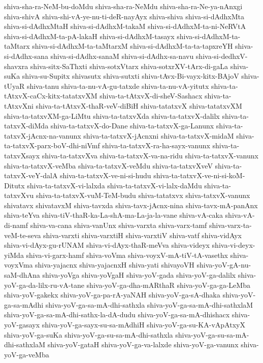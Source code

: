 {shiva-sha-ra-NeM-bu-doMdu
shiva-sha-ra-NeMdu
shiva-sha-ra-Ne-ya-nAnxgi
shiva-shivA
shiva-shi-vA-ye-nu-ti-deR-nayAyx
shiva-shiva
shiva-si-dAdhxMta
shiva-si-dAdhxMtaH
shiva-si-dAdhxM-takaM
shiva-si-dAdhxM-ta-ni-NeRVtA
shiva-si-dAdhxM-ta-pA-lakaH
shiva-si-dAdhxM-tasayx
shiva-si-dAdhxM-ta-taMtarx
shiva-si-dAdhxM-ta-taMtarxM
shiva-si-dAdhxM-ta-ta-tapxreYH
shiva-si-dAdhx-sana
shiva-si-dAdhx-sanaM
shiva-si-dAdhx-sa-navu
shiva-si-dedhxV-shavxra
shiva-sitx-SaThxti
shiva-sotxVtarx
shiva-sotxrXV-tArx-di-gaLa
shiva-suKa
shiva-su-Supitx
shivasutx
shiva-sutxti
shiva-tAvx-Bi-vayx-kitx-BAjoV
shiva-tUyaR
shiva-tanu
shiva-ta-nu-vA-gu-tatxde
shiva-ta-nu-vA-yitutx
shiva-ta-tAtxvX-caCx-kitx-tatatxvXM
shiva-ta-tAtxvX-di-sheV-Sashacx
shiva-ta-tAtxvXni
shiva-ta-tAtxvX-thaR-veV-diBiH
shiva-tatatxvX
shiva-tatatxvXM
shiva-ta-tatxvXM-ga-LiMtu
shiva-ta-tatxvXda
shiva-ta-tatxvX-dalilx
shiva-ta-tatxvX-diMda
shiva-ta-tatxvX-do-Dane
shiva-ta-tatxvX-ga-Lanunx
shiva-ta-tatxvX-jAcnx-na-vanunx
shiva-ta-tatxvX-jAcnxni
shiva-ta-tatxvX-midaM
shiva-ta-tatxvX-parx-boV-dhi-niVmf
shiva-ta-tatxvX-ra-ha-sayx-vanunx
shiva-ta-tatxvXsayx
shiva-ta-tatxvXva
shiva-ta-tatxvX-va-na-ridu
shiva-ta-tatxvX-vanunx
shiva-ta-tatxvX-veMba
shiva-ta-tatxvX-veMdu
shiva-ta-tatxvXveV
shiva-ta-tatxvX-veY-dalA
shiva-ta-tatxvX-ve-ni-si-hudu
shiva-ta-tatxvX-ve-ni-si-koM-Ditutx
shiva-ta-tatxvX-vi-lalxda
shiva-ta-tatxvX-vi-lalx-daMdu
shiva-ta-tatxvXvu
shiva-ta-tatxvX-vuM-TeM-budu
shiva-tatatxvx
shiva-tatxvX-vanunx
shivatavx
shivatavxM
shiva-tavxda
shiva-tavx-jAcnx-nina
shiva-tavx-mA-panAnx
shiva-teYva
shiva-tiV-thaR-ka-La-shA-ma-La-ja-la-vane
shiva-vA-caka
shiva-vA-di-namf
shiva-va-cana
shiva-vanUnx
shiva-varxta
shiva-varx-tamf
shiva-varx-ta-veM-te-seva
shiva-varxti
shiva-varxtiH
shiva-varxtiV
shiva-vatf
shiva-vidAyx
shiva-vi-dAyx-gu-rUNAM
shiva-vi-dAyx-thaR-meVva
shiva-videyx
shiva-vi-deyx-yiMda
shiva-vi-garx-hamf
shiva-voVma
shiva-voyxV-mA-tiV-tA-vasethx
shiva-voyxVma
shiva-yajacnx
shiva-yajacnxH
shiva-yati
shivayoVH
shiva-yoV-gA-nu-saM-dhAna
shiva-yoVga
shiva-yoVgaH
shiva-yoV-gada
shiva-yoV-ga-dalilx
shiva-yoV-ga-da-lilx-ru-vA-tane
shiva-yoV-ga-dha-mARthaR
shiva-yoV-ga-ga-LeMba
shiva-yoV-gakekx
shiva-yoV-ga-pa-rA-yaNAH
shiva-yoV-ga-sA-dhaka
shiva-yoV-ga-sa-mAdhi
shiva-yoV-ga-sa-mA-dhi-sathxla
shiva-yoV-ga-sa-mA-dhi-sathxlaM
shiva-yoV-ga-sa-mA-dhi-sathx-la-dA-dudu
shiva-yoV-ga-sa-mA-dhishacx
shiva-yoV-gasayx
shiva-yoV-ga-sayx-su-sa-mAdhiH
shiva-yoV-ga-su-KA-vApAtxyX
shiva-yoV-ga-suKa
shiva-yoV-ga-su-sa-mA-dhi-sathxla
shiva-yoV-ga-su-sa-mA-dhi-sathxlaM
shiva-yoV-gataH
shiva-yoV-ga-va-lalxde
shiva-yoV-ga-vanunx
shiva-yoV-ga-veMba
}
